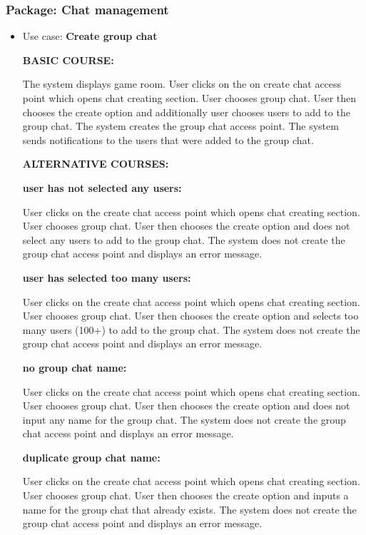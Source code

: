 \documentclass[]{VUMIFTemplateClass}
\begin{document}
\subsubsection{Package: Chat management}
\begin{itemize}

    \item 
    Use case: \textbf{Create group chat}

    \textbf{BASIC COURSE:}

    The system displays game room. User clicks on the on create chat access point which opens chat creating section.
    User chooses group chat. User then chooses the create option and additionally user chooses users to add to 
    the group chat. The system creates the group chat access point. The system sends 
    notifications to the users that were added to the group chat.

    \textbf{ALTERNATIVE COURSES:}

    \textbf{user has not selected any users:}

    User clicks on the create chat access point which opens chat creating section. User chooses group chat. User then chooses the create option and does not select any users to add to the group chat. The system does not create the group chat access point and displays an error message.

    \textbf{user has selected too many users:}

    User clicks on the create chat access point which opens chat creating section. User chooses group chat. User then chooses the create option and selects too many users (100+) to add to the group chat. The system does not create the group chat access point and displays an error message.

    \textbf{no group chat name:}

    User clicks on the create chat access point which opens chat creating section. User chooses group chat. User then chooses the create option and does not input any name for the group chat. The system does not create the group chat access point and displays an error message.

    \textbf{duplicate group chat name:}

    User clicks on the create chat access point which opens chat creating section. User chooses group chat. User then chooses the create option and inputs a name for the group chat that already exists. The system does not create the group chat access point and displays an error message.


\end{itemize}
\end{document}
